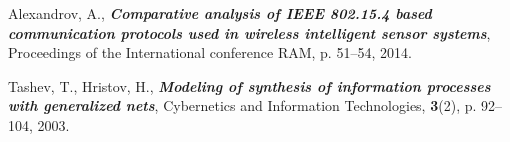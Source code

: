 \documentclass[11pt]{article}
\begin{document}
\begin{thebibliography}{99}
 Alexandrov, A., \textbf{\textit{Comparative analysis of IEEE 802.15.4 based communication protocols used in wireless intelligent sensor systems}}, Proceedings of the International conference RAM, p. 51--54, 2014.

 Tashev, T., Hristov, H., \textbf{\textit{Modeling of synthesis of information processes with generalized nets}}, Cybernetics and Information Technologies, \textbf{3}(2), p. 92--104, 2003.

\end{thebibliography}
\end{document}
